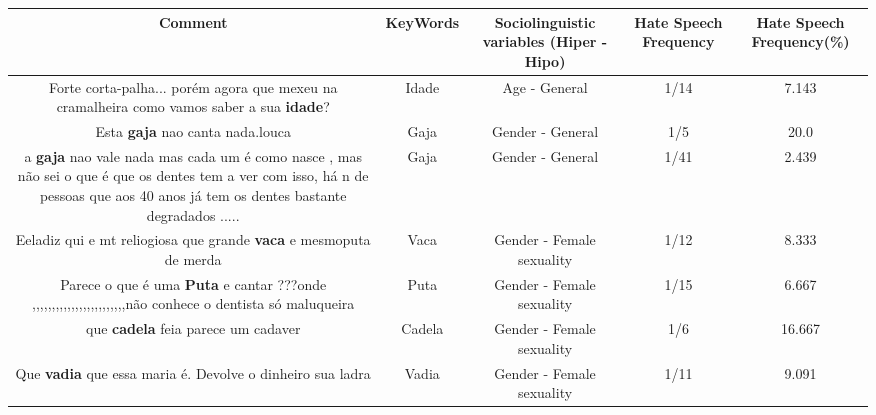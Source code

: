 \documentclass[11pt]{article}
\newlength\mylength
\begin{document}
\begin{center}
\setlength\mylength{\dimexpr\textwidth - 1\arrayrulewidth - 50\tabcolsep}
\begin{longtable}{|C{.65\mylength}|C{.30\mylength}|C{.12\mylength}|C{.12\mylength}|C{.12\mylength}|}
\hline
\textbf{Comment} & \textbf{KeyWords} & \textbf{Sociolinguistic variables (Hiper - Hipo)}  & \textbf{Hate Speech Frequency} & \textbf{Hate Speech Frequency(\%)} \\
\hline{}\small Forte corta-palha... porém agora que mexeu na cramalheira como vamos saber a sua \textbf{idade}?\normalsize   & Idade & Age - General & 1/14 & 7.143 \\  \hline
  \small Esta \textbf{gaja} nao canta nada.louca\normalsize   & Gaja & Gender - General & 1/5 & 20.0 \\  \hline
  \small a \textbf{gaja} nao vale nada mas cada um é como nasce   , mas não sei o que é que os dentes tem a ver com isso, há n de pessoas que aos 40 anos  já tem os dentes bastante degradados  .....\normalsize   & Gaja & Gender - General & 1/41 & 2.439 \\  \hline
  \small Eeladiz qui e mt reliogiosa que grande \textbf{vaca} e mesmoputa de merda\normalsize   & Vaca & Gender - Female sexuality & 1/12 & 8.333 \\  \hline
  \small Parece o que é uma \textbf{Puta} e cantar ???onde ,,,,,,,,,,,,,,,,,,,,,,,,não conhece o dentista só maluqueira\normalsize   & Puta & Gender - Female sexuality & 1/15 & 6.667 \\  \hline
  \small que \textbf{cadela} feia parece um cadaver\normalsize   & Cadela & Gender - Female sexuality & 1/6 & 16.667 \\  \hline
  \small Que \textbf{vadia} que essa maria é. Devolve o dinheiro sua ladra\normalsize   & Vadia & Gender - Female sexuality & 1/11 & 9.091 \\  \hline

\end{longtable}
\end{center}
\end{document}
